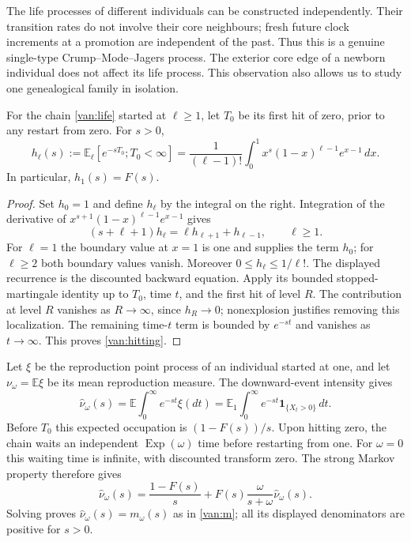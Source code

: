 The life processes of different individuals can be constructed
independently.  Their transition rates do not involve their core
neighbours; fresh future clock increments at a promotion are
independent of the past.  Thus this is a genuine single-type
Crump--Mode--Jagers process.  The exterior core edge of a newborn
individual does not affect its life process.  This observation also
allows us to study one genealogical family in isolation.

\begin{lemma}
\label{van:excursion}
For the chain \eqref{van:life} started at $\ell\ge1$, let $T_0$ be its
first hit of zero, prior to any restart from zero.  For $s>0$,
\begin{equation}
 h_\ell(s):=\mathbb E_\ell[e^{-sT_0};T_0<\infty]
 =\frac1{(\ell-1)!}\int_0^1
 x^s(1-x)^{\ell-1}e^{x-1}\,dx.
 \label{van:hitting}
\end{equation}
In particular, $h_1(s)=F(s)$.
\end{lemma}

\begin{proof}
Set $h_0=1$ and define $h_\ell$ by the integral on the right.
Integration of the derivative of
$x^{s+1}(1-x)^{\ell-1}e^{x-1}$ gives
\[
 (s+\ell+1)h_\ell=\ell h_{\ell+1}+h_{\ell-1},
 \qquad \ell\ge1.
\]
For $\ell=1$ the boundary value at $x=1$ is one and supplies the
term $h_0$; for $\ell\ge2$ both boundary values vanish.
Moreover $0\le h_\ell\le1/\ell!$.
The displayed recurrence is the discounted backward equation.
Apply its bounded stopped-martingale identity up to $T_0$, time $t$,
and the first hit of level $R$.  The contribution at level $R$
vanishes as $R\to\infty$, since $h_R\to0$; nonexplosion justifies
removing this localization.  The remaining time-$t$ term is bounded
by $e^{-st}$ and vanishes as $t\to\infty$.  This proves
\eqref{van:hitting}.
\end{proof}

Let $\xi$ be the reproduction point process of an individual started
at one, and let $\nu_\omega=\mathbb E\xi$ be its mean reproduction
measure.  The downward-event intensity gives
\begin{equation}
 \widehat\nu_\omega(s)
 =\mathbb E\int_0^\infty e^{-st}\xi(dt)
 =\mathbb E_1\int_0^\infty e^{-st}\mathbf1_{\{X_t>0\}}\,dt.
 \label{van:reproduction}
\end{equation}
Before $T_0$ this expected occupation is $(1-F(s))/s$.
Upon hitting zero, the chain waits an independent
$\operatorname{Exp}(\omega)$ time before restarting from one.
For $\omega=0$ this waiting time is infinite, with discounted
transform zero.  The strong Markov property therefore gives
\[
 \widehat\nu_\omega(s)
 =\frac{1-F(s)}s+
 F(s)\frac{\omega}{s+\omega}\widehat\nu_\omega(s).
\]
Solving proves $\widehat\nu_\omega(s)=m_\omega(s)$ as in
\eqref{van:m}; all its displayed denominators are positive for $s>0$.

